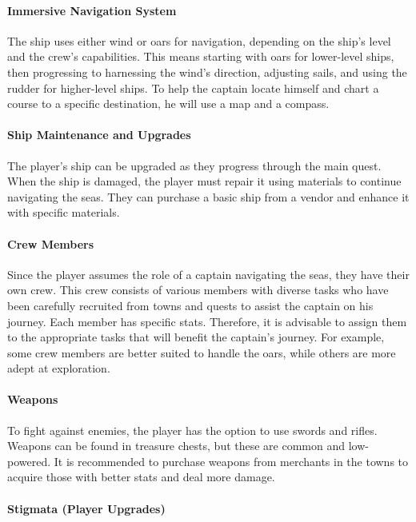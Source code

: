 \documentclass{article}
\begin{document}
\paragraph{Immersive Navigation System}\hfill

The ship uses either wind or oars for navigation, depending on the ship's level and the crew's capabilities. This means starting with oars for lower-level ships, then progressing to harnessing the wind's direction, adjusting sails, and using the rudder for higher-level ships. To help the captain locate himself and chart a course to a specific destination, he will use a map and a compass.

\paragraph{Ship Maintenance and Upgrades}\hfill

The player's ship can be upgraded as they progress through the main quest. When the ship is damaged, the player must repair it using materials to continue navigating the seas. They can purchase a basic ship from a vendor and enhance it with specific materials.

\paragraph{Crew Members}\hfill

Since the player assumes the role of a captain navigating the seas, they have their own crew. This crew consists of various members with diverse tasks who have been carefully recruited from towns and quests to assist the captain on his journey. Each member has specific stats. Therefore, it is advisable to assign them to the appropriate tasks that will benefit the captain's journey. For example, some crew members are better suited to handle the oars, while others are more adept at exploration.

\paragraph{Weapons}\hfill

To fight against enemies, the player has the option to use swords and rifles. Weapons can be found in treasure chests, but these are common and low-powered. It is recommended to purchase weapons from merchants in the towns to acquire those with better stats and deal more damage.

\paragraph{Stigmata (Player Upgrades)}\hfill
\end{document}
